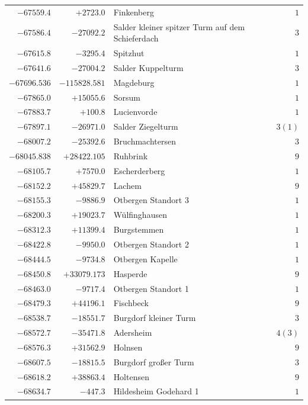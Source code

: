 \begin{center}
\begin{tabular}{r|r|p{170pt}|r}
\(-67559.4\)&\(+2723.0\)&Finkenberg&\(1\)\\
\(-67586.4\)&\(-27092.2\)&Salder kleiner spitzer Turm auf dem Schieferdach&\(3\)\\
\(-67615.8\)&\(-3295.4\)&Spitzhut&\(1\)\\
\(-67641.6\)&\(-27004.2\)&Salder Kuppelturm&\(3\)\\
\(-67696.536\)&\(-115828.581\)&Magdeburg&\(1\)\\
\(-67865.0\)&\(+15055.6\)&Sorsum&\(1\)\\
\(-67883.7\)&\(+100.8\)&Lucienvorde&\(1\)\\
\(-67897.1\)&\(-26971.0\)&Salder Ziegelturm&\(3 (1)\)\\
\(-68007.2\)&\(-25392.6\)&Bruchmachtersen&\(3\)\\
\(-68045.838\)&\(+28422.105\)&Ruhbrink&\(9\)\\
\(-68105.7\)&\(+7570.0\)&Escherderberg&\(1\)\\
\(-68152.2\)&\(+45829.7\)&Lachem&\(9\)\\
\(-68155.3\)&\(-9886.9\)&Otbergen Standort 3&\(1\)\\
\(-68200.3\)&\(+19023.7\)&Wülfinghausen&\(1\)\\
\(-68312.3\)&\(+11399.4\)&Burgstemmen&\(1\)\\
\(-68422.8\)&\(-9950.0\)&Otbergen Standort 2&\(1\)\\
\(-68444.5\)&\(-9734.8\)&Otbergen Kapelle&\(1\)\\
\(-68450.8\)&\(+33079.173\)&Hasperde&\(9\)\\
\(-68463.0\)&\(-9717.4\)&Otbergen Standort 1&\(1\)\\
\(-68479.3\)&\(+44196.1\)&Fischbeck&\(9\)\\
\(-68538.7\)&\(-18551.7\)&Burgdorf kleiner Turm&\(3\)\\
\(-68572.7\)&\(-35471.8\)&Adersheim&\(4 (3)\)\\
\(-68576.3\)&\(+31562.9\)&Holnsen&\(9\)\\
\(-68607.5\)&\(-18815.5\)&Burgdorf großer Turm&\(3\)\\
\(-68618.2\)&\(+38863.4\)&Holtensen&\(9\)\\
\(-68634.7\)&\(-447.3\)&Hildesheim Godehard 1&\(1\)\\
\hline\end{tabular}\endgroup\end{center}
